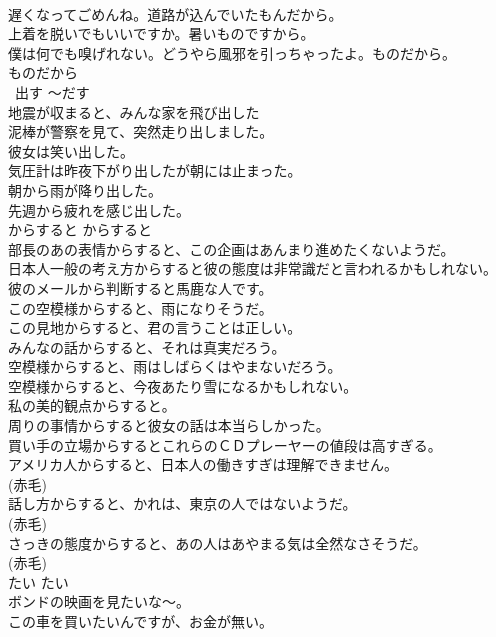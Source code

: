 \documentclass[8pt]{extreport}
\begin{document}
\begin{CJK}{UTF8}{min}
\\	遅くなってごめんね。道路が込んでいたもんだから。  
\\	上着を脱いでもいいですか。暑いものですから。   
\\	僕は何でも嗅げれない。どうやら風邪を引っちゃったよ。ものだから。  
\\	ものだから 
\\	~出す	〜だす	
\\	地震が収まると、みんな家を飛び出した  
\\	泥棒が警察を見て、突然走り出しました。  
\\	彼女は笑い出した。  
\\	気圧計は昨夜下がり出したが朝には止まった。  
\\	朝から雨が降り出した。  
\\	先週から疲れを感じ出した。  
\\	からすると	からすると	
\\	部長のあの表情からすると、この企画はあんまり進めたくないようだ。  
\\	日本人一般の考え方からすると彼の態度は非常識だと言われるかもしれない。  
\\	彼のメールから判断すると馬鹿な人です。   
\\	この空模様からすると、雨になりそうだ。   
\\	この見地からすると、君の言うことは正しい。   
\\	みんなの話からすると、それは真実だろう。   
\\	空模様からすると、雨はしばらくはやまないだろう。   
\\	空模様からすると、今夜あたり雪になるかもしれない。   
\\	私の美的観点からすると。  
\\	周りの事情からすると彼女の話は本当らしかった。   
\\	買い手の立場からするとこれらのＣＤプレーヤーの値段は高すぎる。   
\\	アメリカ人からすると、日本人の働きすぎは理解できません。  
\\	(赤毛)
\\	話し方からすると、かれは、東京の人ではないようだ。  
\\	(赤毛)
\\	さっきの態度からすると、あの人はあやまる気は全然なさそうだ。  
\\	(赤毛)
\\	たい	たい	
\\	ボンドの映画を見たいな〜。  
\\	この車を買いたいんですが、お金が無い。  

\end{CJK}
\end{document}

